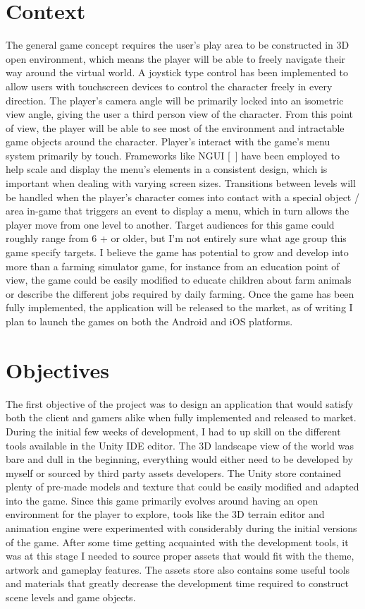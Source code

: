 \section{Context}
The general game concept requires the user's play area to be constructed in 3D open environment, which means the player will be able to freely navigate their way around the virtual world. A joystick type control has been implemented to allow users with touchscreen devices to control the character freely in every direction. The player's camera angle will be primarily locked into an isometric view angle, giving the user a third person view of the character. From this point of view, the player will be able to see most of the environment and intractable game objects around the character. Player's interact with the game's menu system primarily by touch. Frameworks like NGUI [~\cite{NGUI}] have been employed to help scale and display the menu's elements in a consistent design, which is important when dealing with varying screen sizes. Transitions between levels will be handled when the player’s character comes into contact with a special object / area in-game that triggers an event to display a menu, which in turn allows the player move from one level to another. 
Target audiences for this game could roughly range from 6 + or older, but I'm not entirely sure what age group this game specify targets. I believe the game has potential to grow and develop into more than a farming simulator game, for instance from an education point of view, the game could be easily modified to educate children about farm animals or describe the different jobs required by daily farming.
Once the game has been fully implemented, the application will be released to the market, as of writing I plan to launch the games on both the Android and iOS platforms.
\section{Objectives}
The first objective of the project was to design an application that would satisfy both the client and gamers alike when fully implemented and released to market. During the initial few weeks of development, I had to up skill on the different tools available in the Unity IDE editor. The 3D landscape view of the world was bare and dull in the beginning, everything would either need to be developed by myself or sourced by third party assets developers. The Unity store contained plenty of pre-made models and texture that could be easily modified and adapted into the game.
Since this game primarily evolves around having an open environment for the player to explore, tools like the 3D terrain editor and animation engine were experimented with considerably during the initial versions of the game. 
After some time getting acquainted with the development tools, it was at this stage I needed to source proper assets that would fit with the theme, artwork and gameplay features. The assets store also contains some useful tools and materials that greatly decrease the development time required to construct scene levels and game objects.

